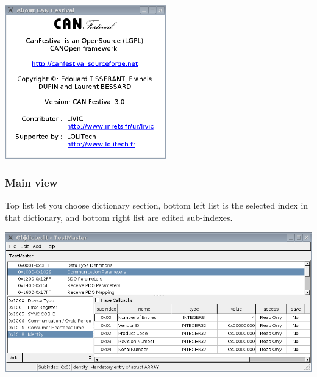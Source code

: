 \documentclass[12pt,twoside]{article}
\begin{document}
 \begin{center}
   \includegraphics[width=7cm]{Pictures/10000201000001FC000001E5D65E8766.png}
\end{center}

\subsubsection{Main view}
Top list let you choose dictionary section, bottom left list is the
selected index in that dictionary, and bottom right list are edited
sub{}-indexes.

 \begin{center}
   \includegraphics[width=14cm]{Pictures/10000201000003E7000001C7B0296577.png}
\end{center}
\end{document}
